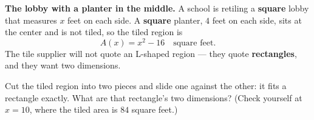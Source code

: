 \documentclass[10pt]{article}
\begin{document}
\boxguard[12]
\begin{hookbox}
\small
\textbf{The lobby with a planter in the middle.} A school is retiling a \textbf{square} lobby that
measures $x$ feet on each side. A \textbf{square} planter, $4$ feet on each side, sits at the center
and is not tiled, so the tiled region is
\[ A(x) = x^2-16 \quad \text{square feet.} \]
The tile supplier will not quote an L-shaped region --- they quote \textbf{rectangles}, and they
want two dimensions.

Cut the tiled region into two pieces and slide one against the other: it fits a rectangle exactly.
What are that rectangle's two dimensions? (Check yourself at $x=10$, where the tiled area is $84$
square feet.)

\\
\\
\end{hookbox}

\vspace{0.10in}
\end{document}
